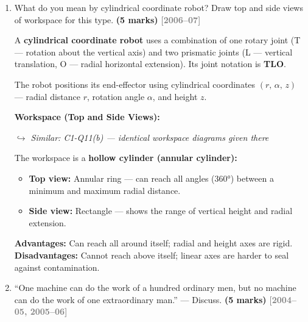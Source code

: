 \documentclass[12pt,a3paper]{article}
\newcommand{\yr}[1]{\hfill\textcolor{gray}{\small\textbf{[#1]}}}
\newcommand{\mk}[1]{\textcolor{orange!70!black}{\small\textbf{(#1 marks)}}}
\newcommand{\variant}[1]{\par\vspace{1pt}\textcolor{blue!50!black}%
  {\footnotesize\textit{$\hookrightarrow$ Similar: #1}}}
\begin{document}
\begin{enumerate}
\begin{tcolorbox}[enhanced,breakable,ansbox,colback=cA!4,colframe=cA,
  boxrule=0.8pt,arc=5pt,
  title={\textbf{Answer}},fonttitle=\bfseries\color{white},colbacktitle=cA]
\end{tcolorbox}

\item \label{qlabel:C1-Q13}
What do you mean by cylindrical coordinate robot? Draw top and side views of workspace for this type. \mk{5}
\yr{2006--07}

\begin{tcolorbox}[enhanced,breakable,ansbox,colback=cA!4,colframe=cA,
  boxrule=0.8pt,arc=5pt,
  title={\textbf{Answer}},fonttitle=\bfseries\color{white},colbacktitle=cA]

A \textbf{cylindrical coordinate robot} uses a combination of one rotary
joint (T — rotation about the vertical axis) and two prismatic joints
(L — vertical translation, O — radial horizontal extension). Its joint
notation is \textbf{TLO}.

The robot positions its end-effector using cylindrical coordinates
$(r,\, \alpha,\, z)$ — radial distance $r$, rotation angle $\alpha$, and
height $z$.

\textbf{Workspace (Top and Side Views):}

\variant{C1-Q11(b) — identical workspace diagrams given there}

The workspace is a \textbf{hollow cylinder (annular cylinder):}
\begin{itemize}[leftmargin=1.5em,itemsep=1pt]
  \item \textbf{Top view:} Annular ring — can reach all angles (360°) between
        a minimum and maximum radial distance.
  \item \textbf{Side view:} Rectangle — shows the range of vertical height
        and radial extension.
\end{itemize}

\textbf{Advantages:} Can reach all around itself; radial and height axes
are rigid. \textbf{Disadvantages:} Cannot reach above itself; linear axes
are harder to seal against contamination.

\end{tcolorbox}

\item \label{qlabel:C1-Q14}
``One machine can do the work of a hundred ordinary men, but no machine can do the work of one extraordinary man.'' --- Discuss. \mk{5}
\yr{2004--05, 2005--06}


\end{enumerate}
\end{document}
